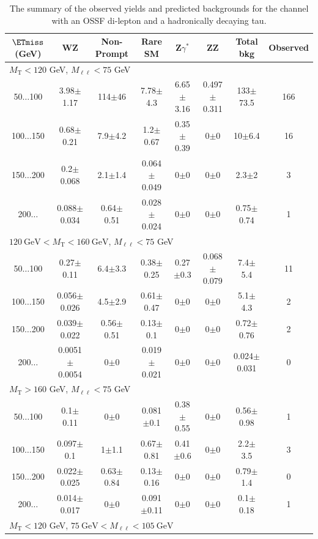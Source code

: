 \begin{table}
\scriptsize
\begin{center}
\caption{\label{tab:OSSF1tau1} The summary of the observed yields and predicted backgrounds for the channel 
with an OSSF di-lepton and a hadronically decaying tau. }
\begin{tabular}{| c | c c c c c c c | }\hline\hline
$\ETmiss$ (GeV) & WZ & Non-Prompt & Rare SM & Z$\gamma^*$ & ZZ & Total bkg & Observed\\\hline\hline
\multicolumn{8}{l}{$M_{\text{T}} < 120$ GeV, $M_{\ell\ell} < 75$ GeV}\\\hline\hline
50$\dots$100&3.98$\pm$1.17&114$\pm$46&7.78$\pm$4.3&6.65$\pm$3.16&0.497$\pm$0.311&133$\pm$73.5&166\\
100$\dots$150&0.68$\pm$0.21&7.9$\pm$4.2&1.2$\pm$0.67&0.35$\pm$0.39&0$\pm$0&10$\pm$6.4&16\\
150$\dots$200&0.2$\pm$0.068&2.1$\pm$1.4&0.064$\pm$0.049&0$\pm$0&0$\pm$0&2.3$\pm$2&3\\
200$\dots$&0.088$\pm$0.034&0.64$\pm$0.51&0.028$\pm$0.024&0$\pm$0&0$\pm$0&0.75$\pm$0.74&1\\
\hline\hline
\multicolumn{8}{l}{$120~\mathrm{GeV} < M_{\text{T}} < 160~\mathrm{GeV}$, $M_{\ell\ell} < 75$ GeV}\\\hline\hline
50$\dots$100&0.27$\pm$0.11&6.4$\pm$3.3&0.38$\pm$0.25&0.27$\pm$0.3&0.068$\pm$0.079&7.4$\pm$5.4&11\\
100$\dots$150&0.056$\pm$0.026&4.5$\pm$2.9&0.61$\pm$0.47&0$\pm$0&0$\pm$0&5.1$\pm$4.3&2\\
150$\dots$200&0.039$\pm$0.022&0.56$\pm$0.51&0.13$\pm$0.1&0$\pm$0&0$\pm$0&0.72$\pm$0.76&2\\
200$\dots$&0.0051$\pm$0.0054&0$\pm$0&0.019$\pm$0.021&0$\pm$0&0$\pm$0&0.024$\pm$0.031&0\\
\hline\hline
\multicolumn{8}{l}{$M_{\text{T}} > 160$ GeV, $M_{\ell\ell} < 75$ GeV}\\\hline\hline
50$\dots$100&0.1$\pm$0.11&0$\pm$0&0.081$\pm$0.1&0.38$\pm$0.55&0$\pm$0&0.56$\pm$0.98&1\\
100$\dots$150&0.097$\pm$0.1&1$\pm$1.1&0.67$\pm$0.81&0.41$\pm$0.6&0$\pm$0&2.2$\pm$3.5&3\\
150$\dots$200&0.022$\pm$0.025&0.63$\pm$0.84&0.13$\pm$0.16&0$\pm$0&0$\pm$0&0.79$\pm$1.4&0\\
200$\dots$&0.014$\pm$0.017&0$\pm$0&0.091$\pm$0.11&0$\pm$0&0$\pm$0&0.1$\pm$0.18&1\\
\hline\hline
\multicolumn{8}{l}{$M_{\text{T}} < 120$ GeV, $75~\mathrm{GeV} < M_{\ell\ell} < 105~\mathrm{GeV}$}\\\hline\hline

\end{tabular}
\end{center}
\end{table}
